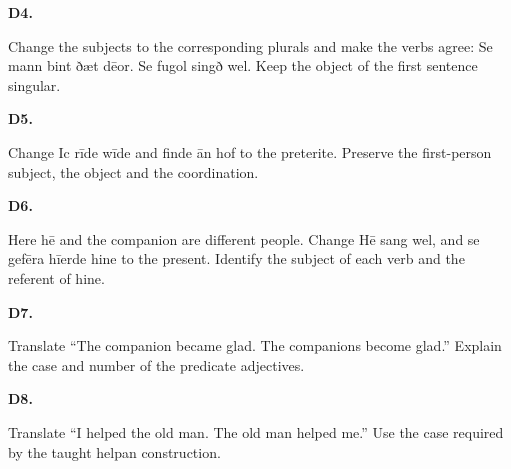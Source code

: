 \par\begin{minipage}{\linewidth}\raggedright
\textbf{D4.}

Change the subjects to the corresponding plurals and make the verbs agree: Se mann bint ðæt dēor. Se fugol singð wel. Keep the object of the first sentence singular.

\end{minipage}\par\addvspace{4pt}

\par\begin{minipage}{\linewidth}\raggedright
\textbf{D5.}

Change Ic rīde wīde and finde ān hof to the preterite. Preserve the first-person subject, the object and the coordination.

\end{minipage}\par\addvspace{4pt}

\par\begin{minipage}{\linewidth}\raggedright
\textbf{D6.}

Here hē and the companion are different people. Change Hē sang wel, and se gefēra hīerde hine to the present. Identify the subject of each verb and the referent of hine.

\end{minipage}\par\addvspace{4pt}

\par\begin{minipage}{\linewidth}\raggedright
\textbf{D7.}

Translate “The companion became glad. The companions become glad.” Explain the case and number of the predicate adjectives.

\end{minipage}\par\addvspace{4pt}

\par\begin{minipage}{\linewidth}\raggedright
\textbf{D8.}

Translate “I helped the old man. The old man helped me.” Use the case required by the taught helpan construction.

\end{minipage}\par\addvspace{4pt}

